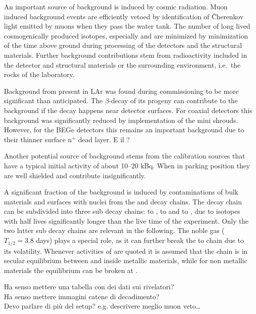  An important source of background is induced by cosmic radiation. Muon induced background events are efficiently vetoed by identification of Čherenkov light emitted by muons when they pass the water tank. The number of long lived cosmogenically produced isotopes, especially  and  are minimized by minimization of the time above ground during processing of the detectors and the structural materials. Further background contributions stem from radioactivity included in the detector and structural materials or the surrounding environment, i.e.~the rocks of the laboratory.

Background from  present in LAr was found during {\gerda} commissioning to be more significant than anticipated. The $\beta$-decay of its progeny  can contribute to the background if the decay happens near detector surfaces. For coaxial detectors this background was significantly reduced by implementation of the mini shrouds. However, for the BEGe detectors this remains an important background due to their thinner surface n$^+$ dead layer. {\color{red}E il ?}

Another potential source of background stems from the calibration sources that have a typical initial activity of about 10–20 kBq. When in parking position they are well shielded and contribute insignificantly.

A significant fraction of the background is induced by contaminations of bulk materials and surfaces with nuclei from the  and  decay chains. The  decay chain can be subdivided into three sub decay chains:  to ,  to  and  to , due to isotopes with half lives significantly longer than the live time of the experiment. Only the two latter sub decay chains are relevant in the following. The noble gas  ($T_{1/2} = 3.8$ days) plays a special role, as it can further break the  to  chain due to its volatility. Whenever activities of  are quoted it is assumed that the chain is in secular equilibrium between  and  inside metallic materials, while for non metallic materials the equilibrium can be broken at .

{\noindent\color{red}Ha senso mettere una tabella con dei dati sui rivelatori?\\
Ha senso mettere immagini catene di decadimento?\\
Devo parlare di più del setup? e.g. descrivere meglio muon veto\ldots}
